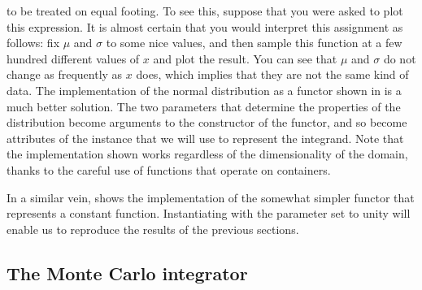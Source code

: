 to be treated on equal footing. To see this, suppose that you were asked to plot this
expression. It is almost certain that you would interpret this assignment as follows: fix $\mu$
and $\sigma$ to some nice values, and then sample this function at a few hundred different
values of $x$ and plot the result. You can see that $\mu$ and $\sigma$ do not change as
frequently as $x$ does, which implies that they are not the same kind of data. The
implementation of the normal distribution as a functor shown in  is
a much better solution.
%
%
The two parameters that determine the properties of the distribution become arguments to the
constructor of the functor, and so become attributes of the instance that we will use to
represent the integrand. Note that the implementation shown works regardless of the
dimensionality of the domain, thanks to the careful use of functions that operate on
containers. 

In a similar vein,  shows the implementation of the somewhat
simpler functor  that represents a constant function. Instantiating
 with the parameter  set to unity will enable us to
reproduce the results of the previous sections.
%
%

\subsection{The Monte Carlo integrator}
\label{sec:classes:driver:final}

